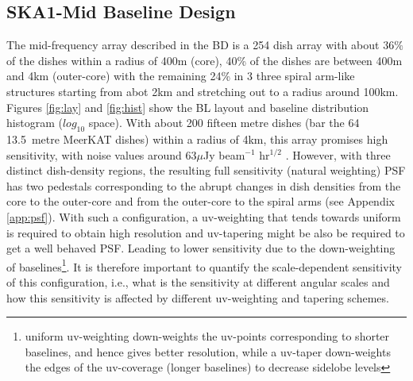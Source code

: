 \documentclass[sfheadings,a4paper,10pt,floats,floatfix]{article}
\begin{document}
\subsection{SKA1-Mid Baseline Design}\label{sec:BL}
The mid-frequency array described in the BD is a 254 dish array with about $36\%$ of the dishes within a radius of 400m (core),
40\% of the dishes are between 400m and 4km (outer-core) with the remaining 24\% in 3 three spiral arm-like structures starting
from abot 2km and stretching out to a radius around 100km. Figures \ref{fig:lay} and \ref{fig:hist} show the BL layout and
baseline distribution histogram ($log_{10}$ space). With about 200 fifteen metre dishes (bar the 64 13.5~metre MeerKAT dishes)
within a radius of 4km, this array promises high sensitivity, with noise values around 63$\mu$Jy beam$^{-1}$ hr$^{1/2}$ \cite{bd}.
However, with three distinct dish-density regions, the resulting full sensitivity (natural weighting) PSF has two pedestals
corresponding to the abrupt changes in dish densities from the core to the outer-core and from the outer-core to the spiral arms
(see Appendix \ref{app:psf}). With such a configuration, a uv-weighting that tends towards uniform is required to obtain high
resolution and uv-tapering might be also be required to get a well behaved PSF. Leading to lower sensitivity due to the
down-weighting of baselines\footnote{uniform uv-weighting down-weights the uv-points corresponding to shorter baselines, and hence
gives better resolution, while a uv-taper down-weights the edges of the uv-coverage (longer baselines) to decrease sidelobe
levels}. It is therefore important to quantify the scale-dependent sensitivity of this configuration, i.e., what is the
sensitivity at different angular scales and how this sensitivity is affected by different uv-weighting and tapering schemes. 
\end{document}
